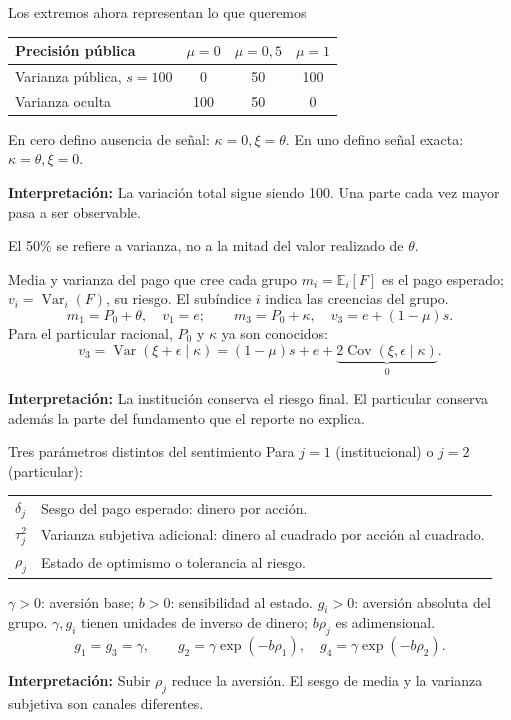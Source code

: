 \documentclass[aspectratio=169,11pt]{beamer}
\newcommand{\E}{\mathbb E}
\newcommand{\Var}{\operatorname{Var}}
\newcommand{\Cov}{\operatorname{Cov}}
\newcommand{\idea}[1]{\par\medskip\textbf{Interpretación:} #1}
\begin{document}
\begin{frame}{Los extremos ahora representan lo que queremos}
\begin{center}
\begin{tabular}{lccc}
\toprule
Precisión pública & \(\mu=0\) & \(\mu=0{,}5\) & \(\mu=1\)\\
\midrule
Varianza pública, \(s=100\) & 0 & 50 & 100\\
Varianza oculta & 100 & 50 & 0\\
\bottomrule
\end{tabular}
\end{center}
En cero defino ausencia de señal: \(\kappa=0,\xi=\theta\).
En uno defino señal exacta: \(\kappa=\theta,\xi=0\).
\idea{La variación total sigue siendo 100.
Una parte cada vez mayor pasa a ser observable.}
\small\medskip\par
El 50\% se refiere a varianza, no a la mitad del valor realizado de \(\theta\).
\end{frame}

\begin{frame}{Media y varianza del pago que cree cada grupo}
\(m_i=\E_i[F]\) es el pago esperado; \(v_i=\Var_i(F)\), su riesgo.
El subíndice \(i\) indica las creencias del grupo.
\[
m_1=P_0+\theta,\quad v_1=e;\qquad
m_3=P_0+\kappa,\quad v_3=e+(1-\mu)s.
\]
Para el particular racional, \(P_0\) y \(\kappa\) ya son conocidos:
\[
v_3=\Var(\xi+\epsilon\mid\kappa)
=(1-\mu)s+e+
 \underbrace{2\Cov(\xi,\epsilon\mid\kappa)}_{0}.
\]
\idea{La institución conserva el riesgo final. El particular conserva
además la parte del fundamento que el reporte no explica.}
\end{frame}

\begin{frame}{Tres parámetros distintos del sentimiento}
\small
Para \(j=1\) (institucional) o \(j=2\) (particular):
\begin{center}
\begin{tabular}{lp{8.8cm}}
\toprule
\(\delta_j\) & Sesgo del pago esperado: dinero por acción.\\
\(\tau_j^2\) & Varianza subjetiva adicional: dinero al cuadrado por acción al cuadrado.\\
\(\rho_j\) & Estado de optimismo o tolerancia al riesgo.\\
\bottomrule
\end{tabular}
\end{center}
\(\gamma>0\): aversión base; \(b>0\): sensibilidad al estado.
\(g_i>0\): aversión absoluta del grupo.
\(\gamma,g_i\) tienen unidades de inverso de dinero; \(b\rho_j\) es adimensional.
\[
g_1=g_3=\gamma,\qquad
g_2=\gamma\exp(-b\rho_1),\quad
g_4=\gamma\exp(-b\rho_2).
\]
\normalsize
\idea{Subir \(\rho_j\) reduce la aversión. El sesgo de media y la varianza
subjetiva son canales diferentes.}
\end{frame}
\end{document}
